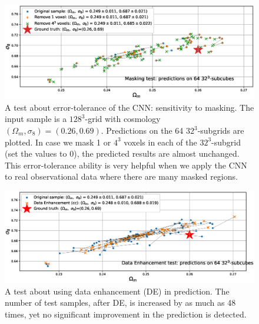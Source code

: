 \documentclass[twocolumn]{aastex61}
\begin{document}
\begin{figure}
   \centering
    \includegraphics[width=16cm]{test_mask.eps}
   \caption{\label{test_smooth}
   A test about error-tolerance of the CNN: sensitivity to masking.
   The input sample is a $128^3$-grid with cosmology $(\Omega_m, \sigma_8)=(0.26,0.69)$.
   Predictions on the 64 $32^3$-subgrids are plotted.
   In case we mask 1 or $4^3$ voxels in each of the $32^3$-subgrid (set the values to 0), the predicted results are almost unchanged.
   This error-tolerance ability is very helpful when we apply the CNN to real observational data where there are many masked regions.
   }
\end{figure}

\begin{figure}
   \centering
    \includegraphics[width=16cm]{test_de.eps}
   \caption{\label{test_de}
   A test about using data enhancement (DE) in prediction.
   The number of test samples, after DE, is increased by as much as 48 times, yet no significant improvement in the prediction is detected.
   }
\end{figure}
\end{document}
